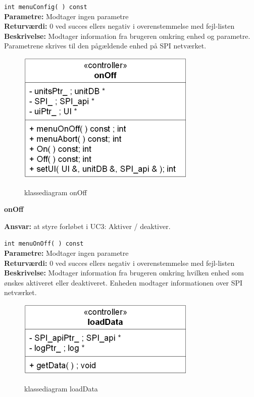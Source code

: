 \verb+int menuConfig( ) const+ \\
\textbf{Parametre:} Modtager ingen parametre \\
\textbf{Returværdi:} 0 ved succes ellers negativ i overenstemmelse med fejl-listen \\
\textbf{Beskrivelse:} Modtager information fra brugeren omkring enhed og parametre. Parametrene skrives til den pågældende enhed på SPI netværket.\\

\begin{figure}[htbp] \centering
{\includegraphics[scale=1.5]{filer/design/Klassediagrammer/sw_onOff}}
\caption{klassediagram onOff}
\label{fig:onOff klassediagram}
\end{figure} 

\newpage

{\centering
\textbf{onOff}\par
}
\textbf{Ansvar:} at styre forløbet i UC3: Aktiver / deaktiver. \

\verb+int menuOnOff( ) const+ \\
\textbf{Parametre:} Modtager ingen parametre \\
\textbf{Returværdi:} 0 ved succes ellers negativ i overenstemmelse med fejl-listen \\
\textbf{Beskrivelse:} Modtager information fra brugeren omkring hvilken enhed som ønskes aktiveret eller deaktiveret. Enheden modtager informationen over SPI netværket.\\

\begin{figure}[htbp] \centering
{\includegraphics[scale=1.5]{filer/design/Klassediagrammer/sw_loadData}}
\caption{klassediagram loadData}
\label{fig:loadData klassediagram}
\end{figure} 

